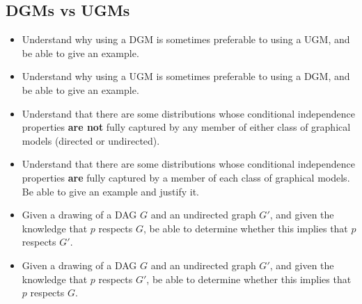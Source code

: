 \documentclass[12pt]{article}
\begin{document}
\subsection{DGMs vs UGMs}
\begin{itemize}
\item Understand why using a DGM is sometimes preferable to using a UGM, and be able to give an example.
\item Understand why using a UGM is sometimes preferable to using a DGM, and be able to give an example.
\item Understand that there are some distributions whose conditional independence properties {\bf are not} fully captured by any member of either class of graphical models (directed or undirected).
\item Understand that there are some distributions whose conditional independence properties {\bf are} fully captured by a member of each class of graphical models. Be able to give an example and justify it.
\item Given a drawing of a DAG $G$ and an undirected graph $G'$, and given the knowledge that $p$ respects $G$, be able to determine whether this implies that $p$ respects $G'$.
\item Given a drawing of a DAG $G$ and an undirected graph $G'$, and given the knowledge that $p$ respects $G'$, be able to determine whether this implies that $p$ respects $G$.
\end{itemize}
\end{document}
